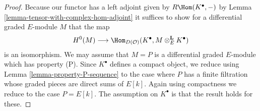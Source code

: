\begin{proof}
Because our functor has a left adjoint given by
$R\Hom(K^\bullet, -)$ by Lemma \ref{lemma-tensor-with-complex-hom-adjoint}
it suffices to show for a differential graded $E$-module $M$ that the map
$$
H^0(M) \longrightarrow
\Hom_{D(\mathcal{O})}(K^\bullet, M \otimes_E^\mathbf{L} K^\bullet)
$$
is an isomorphism. We may assume that $M = P$ is a differential graded
$E$-module which has property (P). Since $K^\bullet$ defines a
compact object, we reduce using
Lemma \ref{lemma-property-P-sequence}
to the case where $P$ has a finite filtration whose graded pieces
are direct sums of $E[k]$. Again using compactness we reduce
to the case $P = E[k]$. The assumption on $K^\bullet$ is that
the result holds for these.
\end{proof}























